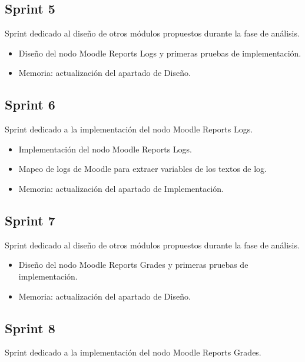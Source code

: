 \subsection{Sprint 5}

Sprint dedicado al diseño de otros módulos propuestos durante la fase de análisis. 

\begin{itemize}
	\item Diseño del nodo Moodle Reports Logs y primeras pruebas de implementación. 
	\item Memoria: actualización del apartado de Diseño.
\end{itemize}



\subsection{Sprint 6}

Sprint dedicado a la implementación del nodo Moodle Reports Logs. 

\begin{itemize}
	\item Implementación del nodo Moodle Reports Logs. 
	\item Mapeo de logs de Moodle para extraer variables de los textos de log. 
	\item Memoria: actualización del apartado de Implementación. 
\end{itemize}



\subsection{Sprint 7}

Sprint dedicado al diseño de otros módulos propuestos durante la fase de análisis. 

\begin{itemize}
	\item Diseño del nodo Moodle Reports Grades y primeras pruebas de implementación. 
	\item Memoria: actualización del apartado de Diseño.
\end{itemize}


\subsection{Sprint 8}

Sprint dedicado a la implementación del nodo Moodle Reports Grades. 

